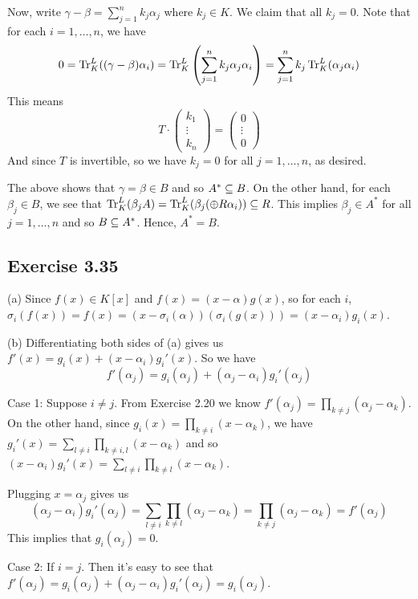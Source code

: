 \documentclass[../Marcus.tex]{subfiles}
\begin{document}
Now, write $\gamma-\beta = \sum_{j=1}^n k_j\alpha_j$ where $k_j\in K$. We claim that all $k_j=0$. Note that for each $i=1,\ldots,n$, we have
$$
0
= \operatorname{Tr}^L_K((\gamma-\beta)\alpha_i)
=  \operatorname{Tr}^L_K \left(\sum_{j=1}^n k_j\alpha_j \alpha_i\right)
= \sum_{j=1}^n k_j \operatorname{Tr}^L_K(\alpha_j\alpha_i)
$$
This means
$$
T \cdot
\begin{pmatrix}
    k_1 \\
    \vdots \\
    k_n
\end{pmatrix}
=
\begin{pmatrix}
    0 \\
    \vdots \\
    0
\end{pmatrix}
$$
And since $T$ is invertible, so we have $k_j=0$ for all $j=1,\ldots,n$, as desired.

The above shows that $\gamma = \beta \in B$ and so $A^* \subseteq B$. On the other hand, for each $\beta_j \in B$, we see that $\operatorname{Tr}^L_K(\beta_j A) = \operatorname{Tr}^L_K(\beta_j (\oplus R\alpha_i)) \subseteq R$. This implies $\beta_j\in A^*$ for all $j=1,\ldots,n$ and so $B\subseteq A^*$. Hence, $A^*=B$.

\subsection*{Exercise 3.35}

(a) Since $f(x)\in K[x]$ and $f(x)=(x-\alpha)g(x)$, so for each $i$, $\sigma_i(f(x)) = f(x) = (x-\sigma_i(\alpha))(\sigma_i(g(x))) = (x-\alpha_i)g_i(x)$.

(b) Differentiating both sides of (a) gives us $f'(x) = g_i(x) + (x-\alpha_i)g_i'(x)$. So we have
$$
f'(\alpha_j) = g_i(\alpha_j) + (\alpha_j-\alpha_i)g_i'(\alpha_j)
$$

Case 1: Suppose $i\neq j$. From Exercise 2.20 we know $f'(\alpha_j) = \prod_{k\neq j} (\alpha_j-\alpha_k)$. On the other hand, since $g_i(x) = \prod_{k\neq i} (x-\alpha_k)$, we have $g_i'(x) = \sum_{l\neq i} \prod_{k\neq i,l} (x-\alpha_k)$ and so $(x-\alpha_i)g_i'(x) = \sum_{l\neq i} \prod_{k\neq l} (x-\alpha_k)$.

Plugging $x=\alpha_j$ gives us
$$
(\alpha_j-\alpha_i) g_i'(\alpha_j)
= \sum_{l\neq i} \prod_{k\neq l} (\alpha_j-\alpha_k)
= \prod_{k\neq j} (\alpha_j-\alpha_k)
= f'(\alpha_j)
$$
This implies that $g_i(\alpha_j) = 0$.

Case 2: If $i=j$. Then it's easy to see that $f'(\alpha_j) = g_i(\alpha_j) + (\alpha_j-\alpha_i)g_i'(\alpha_j) = g_i(\alpha_j)$.
\end{document}
